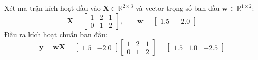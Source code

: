 \begin{example}
Xét ma trận kích hoạt đầu vào $\mathbf{X} \in \mathbb{R}^{2 \times 3}$ và vector trọng số ban đầu $\mathbf{w} \in \mathbb{R}^{1 \times 2}$:
\begin{equation*}
\mathbf{X} = \begin{bmatrix} 1 & 2 & 1 \\ 0 & 1 & 2 \end{bmatrix}, \qquad \mathbf{w} = \begin{bmatrix} 1.5 & -2.0 \end{bmatrix}
\end{equation*}
Đầu ra kích hoạt chuẩn ban đầu:
\begin{equation*}
\mathbf{y} = \mathbf{w} \mathbf{X} = \begin{bmatrix} 1.5 & -2.0 \end{bmatrix} \begin{bmatrix} 1 & 2 & 1 \\ 0 & 1 & 2 \end{bmatrix} = \begin{bmatrix} 1.5 & 1.0 & -2.5 \end{bmatrix}
\end{equation*}


\end{example}
